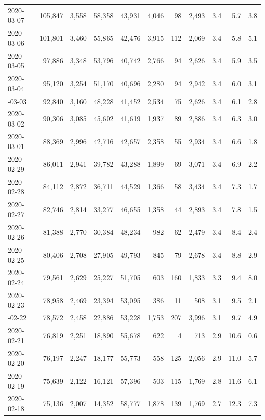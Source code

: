 \documentclass[12pt, a4paper,oneside]{book}
\theoremstyle{definition}
\begin{document}
\begin{longtable}{lrrrrrrrrrr}
	2020-03-07 & 105,847 & 3,558 & 58,358 & 43,931 & 4,046 & 98 & 2,493 & 3.4 & 5.7 & 3.8\\
	\rowcolor{gray!6}  2020-03-06 & 101,801 & 3,460 & 55,865 & 42,476 & 3,915 & 112 & 2,069 & 3.4 & 5.8 & 5.1\\
	2020-03-05 & 97,886 & 3,348 & 53,796 & 40,742 & 2,766 & 94 & 2,626 & 3.4 & 5.9 & 3.5\\
	\rowcolor{gray!6}  2020-03-04 & 95,120 & 3,254 & 51,170 & 40,696 & 2,280 & 94 & 2,942 & 3.4 & 6.0 & 3.1\\
	\addlinespace
	2020-03-03 & 92,840 & 3,160 & 48,228 & 41,452 & 2,534 & 75 & 2,626 & 3.4 & 6.1 & 2.8\\
	\rowcolor{gray!6}  2020-03-02 & 90,306 & 3,085 & 45,602 & 41,619 & 1,937 & 89 & 2,886 & 3.4 & 6.3 & 3.0\\
	2020-03-01 & 88,369 & 2,996 & 42,716 & 42,657 & 2,358 & 55 & 2,934 & 3.4 & 6.6 & 1.8\\
	\rowcolor{gray!6}  2020-02-29 & 86,011 & 2,941 & 39,782 & 43,288 & 1,899 & 69 & 3,071 & 3.4 & 6.9 & 2.2\\
	2020-02-28 & 84,112 & 2,872 & 36,711 & 44,529 & 1,366 & 58 & 3,434 & 3.4 & 7.3 & 1.7\\
	\addlinespace
	\rowcolor{gray!6}  2020-02-27 & 82,746 & 2,814 & 33,277 & 46,655 & 1,358 & 44 & 2,893 & 3.4 & 7.8 & 1.5\\
	2020-02-26 & 81,388 & 2,770 & 30,384 & 48,234 & 982 & 62 & 2,479 & 3.4 & 8.4 & 2.4\\
	\rowcolor{gray!6}  2020-02-25 & 80,406 & 2,708 & 27,905 & 49,793 & 845 & 79 & 2,678 & 3.4 & 8.8 & 2.9\\
	2020-02-24 & 79,561 & 2,629 & 25,227 & 51,705 & 603 & 160 & 1,833 & 3.3 & 9.4 & 8.0\\
	\rowcolor{gray!6}  2020-02-23 & 78,958 & 2,469 & 23,394 & 53,095 & 386 & 11 & 508 & 3.1 & 9.5 & 2.1\\
	\addlinespace
	2020-02-22 & 78,572 & 2,458 & 22,886 & 53,228 & 1,753 & 207 & 3,996 & 3.1 & 9.7 & 4.9\\
	\rowcolor{gray!6}  2020-02-21 & 76,819 & 2,251 & 18,890 & 55,678 & 622 & 4 & 713 & 2.9 & 10.6 & 0.6\\
	2020-02-20 & 76,197 & 2,247 & 18,177 & 55,773 & 558 & 125 & 2,056 & 2.9 & 11.0 & 5.7\\
	\rowcolor{gray!6}  2020-02-19 & 75,639 & 2,122 & 16,121 & 57,396 & 503 & 115 & 1,769 & 2.8 & 11.6 & 6.1\\
	2020-02-18 & 75,136 & 2,007 & 14,352 & 58,777 & 1,878 & 139 & 1,769 & 2.7 & 12.3 & 7.3\\

\end{longtable}
\end{document}
